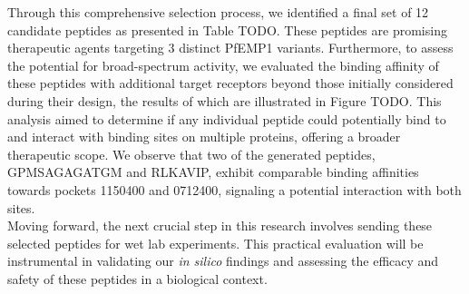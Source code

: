 Through this comprehensive selection process, we identified a final set of 12 candidate peptides as presented in Table TODO. These peptides are promising therapeutic agents targeting 3 distinct PfEMP1 variants. Furthermore, to assess the potential for broad-spectrum activity, we evaluated the binding affinity of these peptides with additional target receptors beyond those initially considered during their design, the results of which are illustrated in Figure TODO. This analysis aimed to determine if any individual peptide could potentially bind to and interact with binding sites on multiple proteins, offering a broader therapeutic scope. We observe that two of the generated peptides, GPMSAGAGATGM and RLKAVIP, exhibit comparable binding affinities towards pockets 1150400 and 0712400, signaling a potential interaction with both sites. \\

Moving forward, the next crucial step in this research involves sending these selected peptides for wet lab experiments. This practical evaluation will be instrumental in validating our \textit{in silico} findings and assessing the efficacy and safety of these peptides in a biological context. \\
